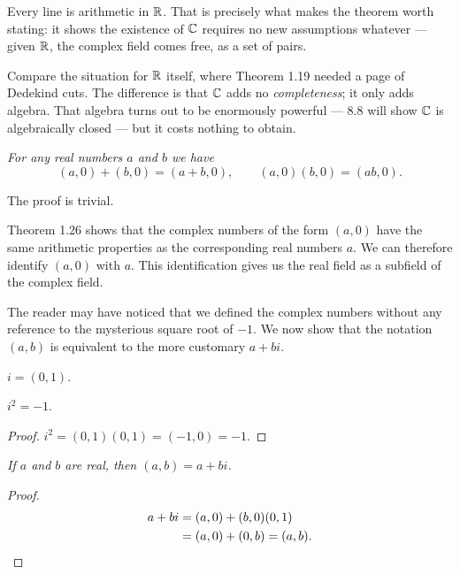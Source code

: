 \begin{deeper}
Every line is arithmetic in $\mathbb{R}$. That is precisely what makes the theorem
worth stating: it shows the existence of $\mathbb{C}$ requires no new assumptions
whatever --- given $\mathbb{R}$, the complex field comes free, as a set of pairs.

Compare the situation for $\mathbb{R}$ itself, where Theorem 1.19 needed a page of
Dedekind cuts. The difference is that $\mathbb{C}$ adds no \emph{completeness}; it only
adds algebra. That algebra turns out to be enormously powerful --- 8.8 will show
$\mathbb{C}$ is algebraically closed --- but it costs nothing to obtain.
\end{deeper}

\emph{For any real numbers $a$ and $b$ we have}
\[ (a,0)+(b,0) = (a+b,0), \qquad (a,0)(b,0) = (ab,0). \]

The proof is trivial.

Theorem 1.26 shows that the complex numbers of the form $(a,0)$ have the same
arithmetic properties as the corresponding real numbers $a$. We can therefore
identify $(a,0)$ with $a$. This identification gives us the real field as a
subfield of the complex field.

The reader may have noticed that we defined the complex numbers without any
reference to the mysterious square root of $-1$. We now show that the notation
$(a,b)$ is equivalent to the more customary $a+bi$.

$i = (0,1)$.

$i^2 = -1$.

\begin{proof}
$i^2 = (0,1)(0,1) = (-1,0) = -1$.
\end{proof}

\emph{If $a$ and $b$ are real, then $(a,b) = a+bi$.}

\begin{proof}
\begin{align*}
  a + bi &= (a,0)+(b,0)(0,1)\\
         &= (a,0)+(0,b) = (a,b). \qedhere
\end{align*}
\end{proof}

